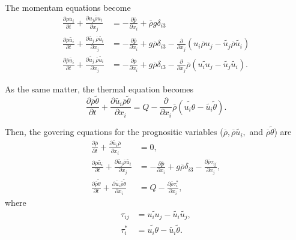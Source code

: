 The momentam equations become
\begin{align}
  \frac{\partial \overline{\rho u_i}}{\partial t} + \frac{\partial \overline{u_j\rho u_i}}{\partial x_j} &= -\frac{\partial \overline{p}}{\partial x_i} + \overline{\rho} g\delta_{i3} \\
  \frac{\partial \overline{\rho}\widetilde{u_i}}{\partial t} + \frac{\partial \widetilde{u_j}\:\overline{\rho}\widetilde{u_i}}{\partial x_j} &= -\frac{\partial \overline{p}}{\partial x_i} + g\overline{\rho} \delta_{i3}
    -\frac{\partial}{\partial x_j}\left(\overline{u_i \rho u_j} - \widetilde{u_j}\overline{\rho}\widetilde{u_i}\right) \\
  \frac{\partial \overline{\rho}\widetilde{u_i}}{\partial t} + \frac{\partial \widetilde{u_j}\:\overline{\rho}\widetilde{u_i}}{\partial x_j} &= -\frac{\partial \overline{p}}{\partial x_i} + g\overline{\rho} \delta_{i3}
    -\frac{\partial}{\partial x_j}\overline{\rho}\left(\widetilde{u_i u_j} - \widetilde{u_j}\widetilde{u_i}\right).
\end{align}


As the same matter, the thermal equation becomes
\begin{equation}
  \frac{\partial \overline{\rho}\widetilde{\theta}}{\partial t}
  + \frac{\partial \widetilde{u_i}\overline{\rho}\widetilde{\theta}}{\partial x_i}
  = Q -\frac{\partial}{\partial x_i}\overline{\rho}\left(\widetilde{u_i\theta}-\widetilde{u_i}\widetilde{\theta}\right).
\end{equation}

Then, the govering equations for the prognositic variables
($\overline{\rho}, \overline{\rho}\widetilde{u_i}, $ and $\overline{\rho}\widetilde{\theta}$) are
\begin{align}
  \frac{\partial \overline{\rho}}{\partial t}
  + \frac{\partial \widetilde{u_i}\overline{\rho}}{\partial x_i} &= 0, \\
  \frac{\partial \overline{\rho}\widetilde{u_i}}{\partial t}
  + \frac{\partial \widetilde{u_j}\overline{\rho}\widetilde{u_i}}{\partial x_j}
  &= -\frac{\partial \overline{p}}{\partial x_i} + g\overline{\rho}\delta_{i3}
  -\frac{\partial \overline{\rho}\tau_{ij}}{\partial x_j}, \\
  \frac{\partial \overline{\rho}\widetilde{\theta}}{\partial t}
  + \frac{\partial \widetilde{u_i}\overline{\rho}\widetilde{\theta}}{\partial x_i}
  &= Q -\frac{\partial \overline{\rho}\tau^*_{i}}{\partial x_i},
\end{align}
where
\begin{align}
  \tau_{ij} &= \widetilde{u_iu_j}-\widetilde{u_i}\widetilde{u_j}, \\
  \tau^*_{i} &= \widetilde{u_i\theta}-\widetilde{u_i}\widetilde{\theta}.
\end{align}

